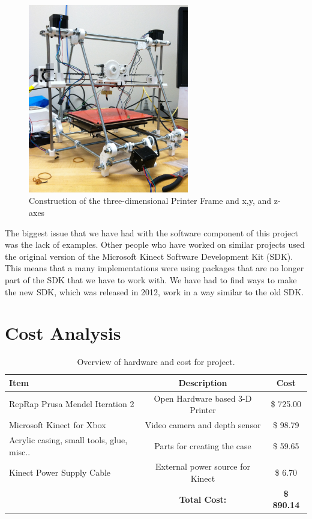 \documentclass[pdftex,10.5pt]{report}
\begin{document}
\begin{figure}[H]
	\centering
	\includegraphics[width=70mm]{figures/photo.JPG}
	\caption{Construction of the three-dimensional Printer Frame and x,y, and z-axes}
	\label{basebuilt}
\end{figure}

The biggest issue that we have had with the software component of this project was the lack of examples. Other people who have worked on similar projects used the original version of the Microsoft Kinect Software Development Kit (SDK). This means that a many implementations were using packages that are no longer part of the SDK that we have to work with. We have had to find ways to make the new SDK, which was released in 2012, work in a way similar to the old SDK. 

\section{Cost Analysis}

\begin{table}[h]
	\centering
 	\begin{tabular}{|l|c|c|}
		\hline
		\textbf{Item} & \textbf{Description} & \textbf{Cost} \\
		\hline
 		RepRap Prusa Mendel Iteration 2 & Open Hardware based 3-D Printer& \$ 725.00\\
		Microsoft Kinect for Xbox & Video camera and depth sensor & \$ 98.79 \\
		Acrylic casing, small tools, glue, misc.. & Parts for creating the case & \$ 59.65 \\
		Kinect Power Supply Cable & External power source for Kinect & \$ 6.70 \\
		\hline
		& \textbf{Total Cost:} & \textbf{\$  890.14} \\
		\hline
	\end{tabular}
	\caption{
	Overview of hardware and cost for project.
	}	
\label{tab:costs}
\end{table}
\end{document}

